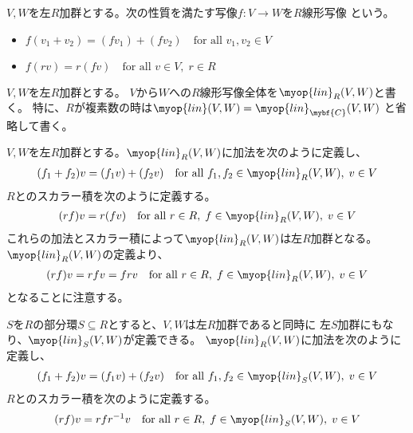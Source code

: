 	\begin{definition}[線形写像]\label{def:線形写像} %
		$V,W$を左$R$加群とする。次の性質を満たす写像$f:V\to W$を$R$線形写像
		という。
		\begin{itemize}\setlength{\itemsep}{-1mm} %
			\item $f(v_1+v_2)=(fv_1)+(fv_2)\quad\text{for all }v_1,v_2\in V$
			\item $f(rv)=r(fv)\quad\text{for all }v\in V,\;r\in R$
		\end{itemize} %
	\end{definition} %

	\begin{definition}[線形写像全体]\label{def:線形写像全体} %
		$V,W$を左$R$加群とする。
		$V$から$W$への$R$線形写像全体を$\myop{lin}_R(V,W)$と書く。
		特に、$R$が複素数の時は$\myop{lin}(V,W)=\myop{lin}_{\mybf{C}}(V,W)$
		と省略して書く。
	\end{definition} %

	$V,W$を左$R$加群とする。$\myop{lin}_R(V,W)$に加法を次のように定義し、
	\begin{equation}\label{eq:線形写像の加法}\begin{split} %
		(f_1+f_2)v = (f_1v)+(f_2v)
		\quad\text{for all }f_1,f_2\in \myop{lin}_R(V,W),\;v\in V
	\end{split}\end{equation} %
	$R$とのスカラー積を次のように定義する。
	\begin{equation}\label{eq:線形写像のスカラー積}\begin{split} %
		(rf)v = r(fv)
		\quad\text{for all }r\in R,\;f\in \myop{lin}_R(V,W),\;v\in V
	\end{split}\end{equation} %
	これらの加法とスカラー積によって$\myop{lin}_R(V,W)$は左$R$加群となる。
	$\myop{lin}_R(V,W)$の定義より、
	\begin{equation*}\begin{split} %
		(rf)v = rfv = frv
		\quad\text{for all }r\in R,\;f\in \myop{lin}_R(V,W),\;v\in V
	\end{split}\end{equation*} %
	となることに注意する。

	$S$を$R$の部分環$S\subseteq R$とすると、$V,W$は左$R$加群であると同時に
	左$S$加群にもなり、$\myop{lin}_S(V,W)$が定義できる。
	$\myop{lin}_R(V,W)$に加法を次のように定義し、
	\begin{equation}\label{eq:線形写像の加法}\begin{split} %
		(f_1+f_2)v = (f_1v)+(f_2v)
		\quad\text{for all }f_1,f_2\in \myop{lin}_S(V,W),\;v\in V
	\end{split}\end{equation} %
	$R$とのスカラー積を次のように定義する。
	\begin{equation}\label{eq:線形写像のスカラー積}\begin{split} %
		(rf)v = rfr^{-1}v
		\quad\text{for all }r\in R,\;f\in \myop{lin}_S(V,W),\;v\in V
	\end{split}\end{equation} %
	
